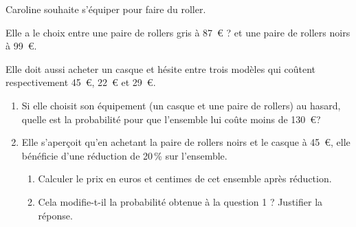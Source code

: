 
\medskip

Caroline souhaite s'équiper pour faire du roller.
 
Elle a le choix entre une paire de rollers gris à 87~\euro{} ? et une paire de rollers noirs à 99~\euro.
 
Elle doit aussi acheter un casque et hésite entre trois modèles qui coûtent respectivement 45~\euro, 22~\euro{} et 29~\euro.

\medskip
 
\begin{enumerate}
\item Si elle choisit son équipement (un casque et une paire de rollers) au hasard, quelle est la probabilité pour que l'ensemble lui coûte moins de 130~\euro{}? 
\item Elle s'aperçoit qu'en achetant la paire de rollers noirs et le casque à 45~\euro, elle bénéficie d'une réduction de 20\,\% sur l'ensemble. 
	\begin{enumerate}
		\item Calculer le prix en euros et centimes de cet ensemble après réduction. 
		\item Cela modifie-t-il la probabilité obtenue à la question 1 ? Justifier la réponse.
	\end{enumerate}
\end{enumerate}
 
\bigskip

